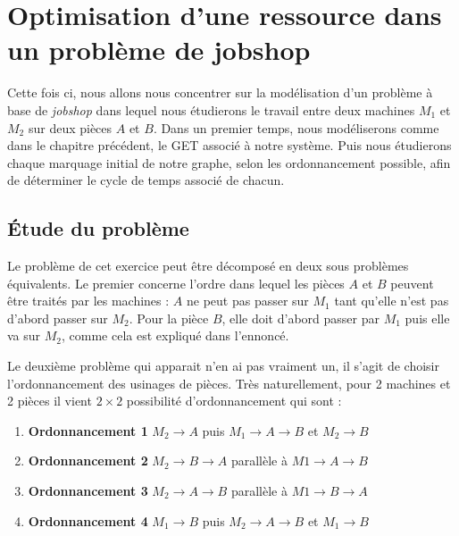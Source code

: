 \chapter{Optimisation d'une ressource dans un problème de jobshop}
Cette fois ci, nous allons nous concentrer sur la modélisation d'un problème à base de \emph{jobshop} dans lequel nous étudierons le travail entre deux machines $M_1$ et $M_2$ sur deux pièces $A$ et $B$. Dans un premier temps, nous modéliserons comme dans le chapitre précédent, le GET associé à notre système. Puis nous étudierons chaque marquage initial de notre graphe, selon les ordonnancement possible, afin de déterminer le cycle de temps associé de chacun.

\section{Étude du problème}



Le problème de cet exercice peut être décomposé en deux sous problèmes équivalents. Le premier concerne l'ordre dans lequel les pièces $A$ et $B$ peuvent être traités par les machines : $A$ ne peut pas passer sur $M_1$ tant qu'elle n'est pas d'abord passer sur $M_2$. Pour la pièce $B$, elle doit d'abord passer par $M_1$ puis elle va sur $M_2$, comme cela est expliqué dans l'ennoncé. 

Le deuxième problème qui apparait n'en ai pas vraiment un, il s'agit de choisir l'ordonnancement des usinages de pièces. Très naturellement, pour 2 machines et 2 pièces il vient $2\times 2$ possibilité d'ordonnancement qui sont : \begin{enumerate}
\item \label{item:o1}\textbf{Ordonnancement 1} $M_2 \rightarrow A$ puis $M_1 \rightarrow A \rightarrow B$ et  $M_2 \rightarrow B$ 
\item \label{item:o2}\textbf{Ordonnancement 2} $M_2 \rightarrow B \rightarrow A $ parallèle à $M1 \rightarrow A \rightarrow B$
\item \label{item:o3}\textbf{Ordonnancement 3}	$M_2 \rightarrow A \rightarrow B $ parallèle à $M1 \rightarrow B \rightarrow A$
\item \label{item:o4}\textbf{Ordonnancement 4}	$M_1 \rightarrow B$ puis $M_2 \rightarrow A \rightarrow B$ et  $M_1 \rightarrow B$
\end{enumerate}

